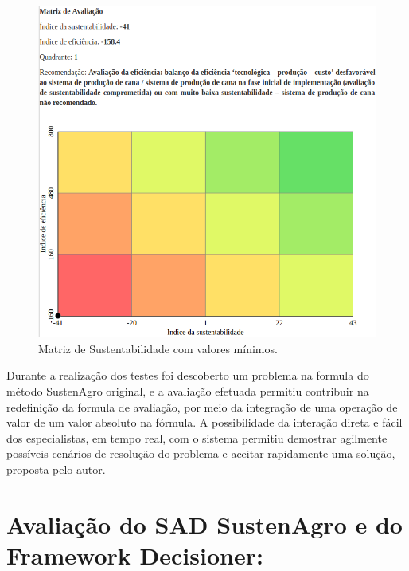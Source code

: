 \begin{figure}[H]
\begin{centering}
\includegraphics[width=1\columnwidth]{figures/Minimum}
\par\end{centering}
\caption{Matriz de Sustentabilidade com valores mínimos.\label{fig:Matriz-de-sustentabilidade-Minimos}}

\end{figure}

 Durante a realização dos testes foi descoberto um problema na formula
do método SustenAgro original, e a avaliação efetuada permitiu contribuir
na redefinição da formula de avaliação, por meio da integração de
uma operação de valor de um valor absoluto na fórmula. A possibilidade
da interação direta e fácil dos especialistas, em tempo real, com
o sistema permitiu demostrar agilmente possíveis cenários de resolução
do problema e aceitar rapidamente uma solução, proposta pelo autor.

\section{Avaliação do SAD SustenAgro e do Framework Decisioner: }

